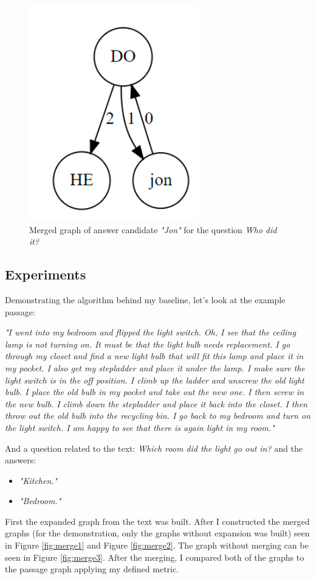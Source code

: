 \begin{figure}
	\centering
	\includegraphics[scale=0.4]{figures/merge}
	\caption{Merged graph of answer candidate \textit{"Jon"} for the
		question \textit{Who did it?}}
	\label{fig:merge}
\end{figure}

\subsection{Experiments}
\label{sec:exp}

Demonstrating the algorithm behind my baseline, let's look at the example passage:
\begin{center}
	\textit{ "I went into my bedroom and flipped the light switch. Oh, I see that the ceiling lamp is not turning on. It must be that the light bulb needs replacement. I go through my closet and find a new light bulb that will fit this lamp and place it in my pocket. I also get my stepladder and place it under the lamp. I make sure the light switch is in the off position. I climb up the ladder and unscrew the old light bulb. I place the old bulb in my pocket and take out the new one. I then screw in the new bulb. I climb down the stepladder and place it back into the closet. I then throw out the old bulb into the recycling bin. I go back to my bedroom and turn on the light switch. I am happy to see that there is again light in my room."}
\end{center}
And a question related to the text: \textit{Which room did the light go out in?} and the answers:
\begin{itemize}
	\item \textit{"Kitchen."}
	\item \textit{"Bedroom."}
\end{itemize}
First the expanded graph from the text was built. After I constructed the merged graphs (for the demonstration, only the graphs without expansion was built) seen in Figure \ref{fig:merge1} and Figure \ref{fig:merge2}. The graph without merging can be seen in Figure \ref{fig:merge3}. After the merging, I compared both of the graphs to the passage graph applying my defined metric.

